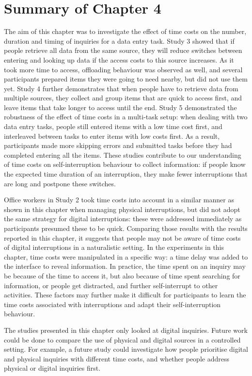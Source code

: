 \section{Summary of Chapter 4}
The aim of this chapter was to investigate the effect of time costs on the number, duration and timing of inquiries for a data entry task. Study 3 showed that if people retrieve all data from the same source, they will reduce switches between entering and looking up data if the access costs to this source increases. As it took more time to access, offloading behaviour was observed as well, and several participants prepared items they were going to need nearby, but did not use them yet. Study 4 further demonstrates that when people have to retrieve data from multiple sources, they collect and group items that are quick to access first, and leave items that take longer to access until the end. Study 5 demonstrated the robustness of the effect of time costs in a multi-task setup: when dealing with two data entry tasks, people still entered items with a low time cost first, and interleaved between tasks to enter items with low costs first. As a result, participants made more skipping errors and submitted tasks before they had completed entering all the items. These studies contribute to our understanding of time costs on self-interruption behaviour to collect information: if people know the expected time duration of an interruption, they make fewer interruptions that are long and postpone these switches. 

Office workers in Study 2 took time costs into account in a similar manner as shown in this chapter when managing physical interruptions, but did not adopt the same strategy for digital interruptions: these were addressed immediately as participants presumed these to be quick. Comparing those results with the results reported in this chapter, it suggests that people may not be aware of time costs of digital interruptions in a naturalistic setting. In the experiments in this chapter, time costs were manipulated in a specific way: a time delay was added to the interface to reveal information. In practice, the time spent on an inquiry may be because of the time to access it, but also because of time spent searching for information, or people get distracted, and further self-interrupt to other activities. These factors may further make it difficult for participants to learn the time costs associated with interruptions and adapt their self-interruption behaviour. 

The studies presented in this chapter only looked at digital inquiries. %
Future work could be done to compare the use of physical and digital sources in a controlled setting. For example, a future study could investigate how people prioritise digital and physical inquiries with different time costs, and whether people address physical or digital inquiries first.  

